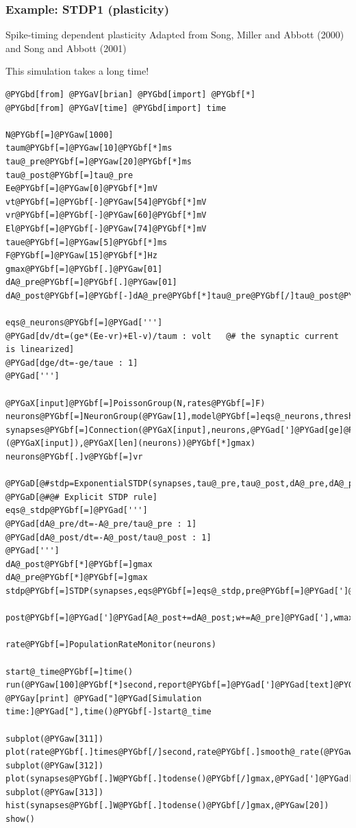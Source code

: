 \documentclass[letterpaper,10pt,english]{manual}
\begin{document}
\hypertarget{index-97}{}\subsubsection{Example: STDP1 (plasticity)}

Spike-timing dependent plasticity
Adapted from Song, Miller and Abbott (2000) and Song and Abbott (2001)

This simulation takes a long time!

\begin{Verbatim}[commandchars=@\[\]]
@PYGbd[from] @PYGaV[brian] @PYGbd[import] @PYGbf[*]
@PYGbd[from] @PYGaV[time] @PYGbd[import] time

N@PYGbf[=]@PYGaw[1000]
taum@PYGbf[=]@PYGaw[10]@PYGbf[*]ms
tau@_pre@PYGbf[=]@PYGaw[20]@PYGbf[*]ms
tau@_post@PYGbf[=]tau@_pre
Ee@PYGbf[=]@PYGaw[0]@PYGbf[*]mV
vt@PYGbf[=]@PYGbf[-]@PYGaw[54]@PYGbf[*]mV
vr@PYGbf[=]@PYGbf[-]@PYGaw[60]@PYGbf[*]mV
El@PYGbf[=]@PYGbf[-]@PYGaw[74]@PYGbf[*]mV
taue@PYGbf[=]@PYGaw[5]@PYGbf[*]ms
F@PYGbf[=]@PYGaw[15]@PYGbf[*]Hz
gmax@PYGbf[=]@PYGbf[.]@PYGaw[01]
dA@_pre@PYGbf[=]@PYGbf[.]@PYGaw[01]
dA@_post@PYGbf[=]@PYGbf[-]dA@_pre@PYGbf[*]tau@_pre@PYGbf[/]tau@_post@PYGbf[*]@PYGaw[1.05]

eqs@_neurons@PYGbf[=]@PYGad[''']
@PYGad[dv/dt=(ge*(Ee-vr)+El-v)/taum : volt   @# the synaptic current is linearized]
@PYGad[dge/dt=-ge/taue : 1]
@PYGad[''']

@PYGaX[input]@PYGbf[=]PoissonGroup(N,rates@PYGbf[=]F)
neurons@PYGbf[=]NeuronGroup(@PYGaw[1],model@PYGbf[=]eqs@_neurons,threshold@PYGbf[=]vt,reset@PYGbf[=]vr)
synapses@PYGbf[=]Connection(@PYGaX[input],neurons,@PYGad[']@PYGad[ge]@PYGad['],weight@PYGbf[=]rand(@PYGaX[len](@PYGaX[input]),@PYGaX[len](neurons))@PYGbf[*]gmax)
neurons@PYGbf[.]v@PYGbf[=]vr

@PYGaD[@#stdp=ExponentialSTDP(synapses,tau@_pre,tau@_post,dA@_pre,dA@_post,wmax=gmax)]
@PYGaD[@#@# Explicit STDP rule]
eqs@_stdp@PYGbf[=]@PYGad[''']
@PYGad[dA@_pre/dt=-A@_pre/tau@_pre : 1]
@PYGad[dA@_post/dt=-A@_post/tau@_post : 1]
@PYGad[''']
dA@_post@PYGbf[*]@PYGbf[=]gmax
dA@_pre@PYGbf[*]@PYGbf[=]gmax
stdp@PYGbf[=]STDP(synapses,eqs@PYGbf[=]eqs@_stdp,pre@PYGbf[=]@PYGad[']@PYGad[A@_pre+=dA@_pre;w+=A@_post]@PYGad['],
          post@PYGbf[=]@PYGad[']@PYGad[A@_post+=dA@_post;w+=A@_pre]@PYGad['],wmax@PYGbf[=]gmax)

rate@PYGbf[=]PopulationRateMonitor(neurons)

start@_time@PYGbf[=]time()
run(@PYGaw[100]@PYGbf[*]second,report@PYGbf[=]@PYGad[']@PYGad[text]@PYGad['])
@PYGay[print] @PYGad["]@PYGad[Simulation time:]@PYGad["],time()@PYGbf[-]start@_time

subplot(@PYGaw[311])
plot(rate@PYGbf[.]times@PYGbf[/]second,rate@PYGbf[.]smooth@_rate(@PYGaw[100]@PYGbf[*]ms))
subplot(@PYGaw[312])
plot(synapses@PYGbf[.]W@PYGbf[.]todense()@PYGbf[/]gmax,@PYGad[']@PYGad[.]@PYGad['])
subplot(@PYGaw[313])
hist(synapses@PYGbf[.]W@PYGbf[.]todense()@PYGbf[/]gmax,@PYGaw[20])
show()
\end{Verbatim}
\end{document}

